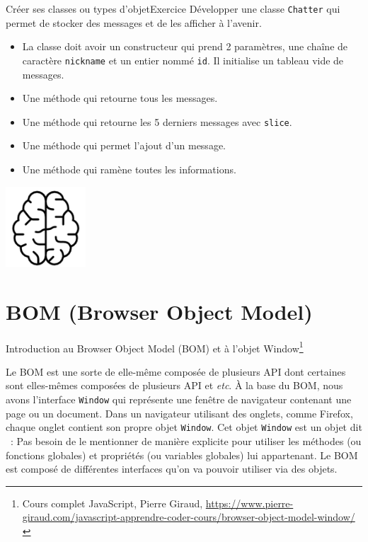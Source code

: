\documentclass{beamer}
\begin{document}
    \begin{frame}{Créer ses classes ou types d'objet}{Exercice \execcounterdispinc{}}
        Développer une classe \lstinline{Chatter} qui permet de stocker des messages et de les afficher à l'avenir.
        \begin{itemize}
            \item La classe doit avoir un constructeur qui prend 2 paramètres, une chaîne de caractère \lstinline{nickname} et un entier nommé \lstinline{id}.
            Il initialise un tableau vide de messages.
            \item Une méthode qui retourne tous les messages.
            \item Une méthode qui retourne les 5 derniers messages avec \lstinline{slice}.
            \item Une méthode qui permet l'ajout d'un message.
            \item Une méthode qui ramène toutes les informations.
        \end{itemize}
        \bigbreak
        \centering
        \includegraphics[width=3cm]{image/intelligence}
    \end{frame}


    \section{BOM (Browser Object Model)}\label{sec:bom}

    \begin{frame}{Introduction au Browser Object Model (BOM) et à l’objet Window\footnote{\label{giraud-js}Cours complet JavaScript, Pierre Giraud, \url{https://www.pierre-giraud.com/javascript-apprendre-coder-cours/browser-object-model-window/}}}
        \begin{footnotesize}
            Le BOM est une sorte de  elle-même composée de plusieurs API dont certaines sont elles-mêmes composées de plusieurs API et \textit{etc}.
            \bigbreak
            À la base du BOM, nous avons l’interface \lstinline{Window} qui représente une fenêtre de navigateur contenant une page ou un document.
            \bigbreak
            Dans un navigateur utilisant des onglets, comme Firefox, chaque onglet contient son propre objet \lstinline{Window}.
            \bigbreak
            Cet objet \lstinline{Window} est un objet dit ~: Pas besoin de le mentionner de manière explicite pour utiliser les méthodes (ou fonctions globales) et propriétés (ou variables globales) lui appartenant.
            \bigbreak
            Le BOM est composé de différentes interfaces qu’on va pouvoir utiliser via des objets.
        \end{footnotesize}
    \end{frame}
\end{document}

